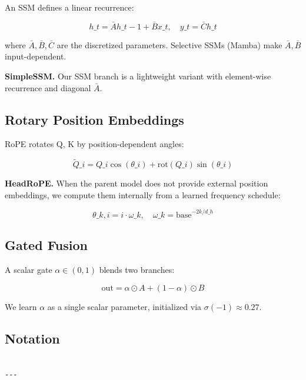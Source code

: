 An SSM defines a linear recurrence:

\[
h\_t = \bar{A} h\_{t-1} + \bar{B} x\_t, \quad
y\_t = \bar{C} h\_t
\tag{3.5}
\]

where $\bar{A}, \bar{B}, \bar{C}$ are the discretized parameters. Selective 
SSMs (Mamba) make $\bar{A}, \bar{B}$ input-dependent.

\textbf{SimpleSSM.} Our SSM branch is a lightweight variant with element-wise 
recurrence and diagonal $\bar{A}$.

\subsection{Rotary Position Embeddings}

RoPE rotates Q, K by position-dependent angles:

\[
\tilde{Q}\_i = Q\_i \cos(\theta\_i) + \text{rot}(Q\_i) \sin(\theta\_i)
\tag{3.6}
\]

\textbf{HeadRoPE.} When the parent model does not provide external position 
embeddings, we compute them internally from a learned frequency schedule:

\[
\theta\_{k, i} = i \cdot \omega\_k, \quad
\omega\_k = \text{base}^{-2k / d\_h}
\tag{3.7}
\]

\subsection{Gated Fusion}

A scalar gate $\alpha \in (0, 1)$ blends two branches:

\[
\text{out} = \alpha \odot A + (1 - \alpha) \odot B
\tag{3.8}
\]

We learn $\alpha$ as a single scalar parameter, initialized via 
$\sigma(-1) \approx 0.27$.

\subsection{Notation}

\begin{lstlisting}

---
\end{lstlisting}